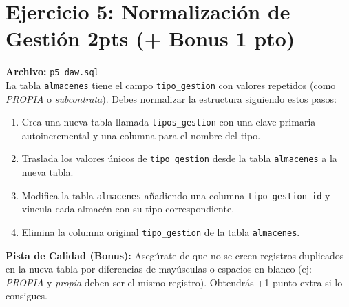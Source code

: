 \documentclass[12pt,a4paper]{article}
\begin{document}
\section{Ejercicio 5: Normalización de Gestión 2pts (+ Bonus 1 pto)}
\textbf{Archivo:} \texttt{p5\_daw.sql} \\
La tabla \texttt{almacenes} tiene el campo \texttt{tipo\_gestion} con valores repetidos (como \textit{PROPIA} o \textit{subcontrata}). Debes normalizar la estructura siguiendo estos pasos:
\begin{enumerate}
    \item Crea una nueva tabla llamada \texttt{tipos\_gestion} con una clave primaria autoincremental y una columna para el nombre del tipo.
    \item Traslada los valores únicos de \texttt{tipo\_gestion} desde la tabla \texttt{almacenes} a la nueva tabla.
    \item Modifica la tabla \texttt{almacenes} añadiendo una columna \texttt{tipo\_gestion\_id} y vincula cada almacén con su tipo correspondiente.
    \item Elimina la columna original \texttt{tipo\_gestion} de la tabla \texttt{almacenes}.
\end{enumerate}
\textbf{Pista de Calidad (Bonus):} Asegúrate de que no se creen registros duplicados en la nueva tabla por diferencias de mayúsculas o espacios en blanco (ej: \textit{PROPIA} y \textit{propia} deben ser el mismo registro). Obtendrás +1 punto extra si lo consigues.
\end{document}
